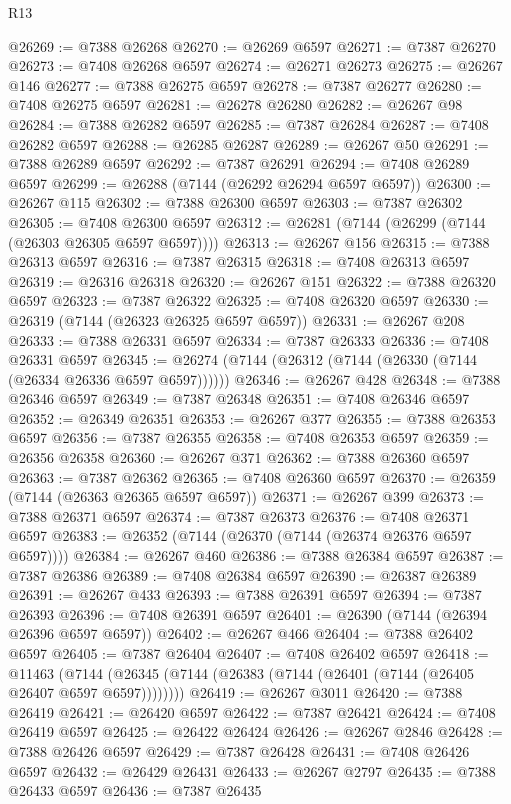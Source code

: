 \begin{lexlean}{R13}
\begin{coremodule}
@26269 := @7388 @26268
@26270 := @26269 @6597
@26271 := @7387 @26270
@26273 := @7408 @26268 @6597
@26274 := @26271 @26273
@26275 := @26267 @146
@26277 := @7388 @26275 @6597
@26278 := @7387 @26277
@26280 := @7408 @26275 @6597
@26281 := @26278 @26280
@26282 := @26267 @98
@26284 := @7388 @26282 @6597
@26285 := @7387 @26284
@26287 := @7408 @26282 @6597
@26288 := @26285 @26287
@26289 := @26267 @50
@26291 := @7388 @26289 @6597
@26292 := @7387 @26291
@26294 := @7408 @26289 @6597
@26299 := @26288 (@7144 (@26292 @26294 @6597 @6597))
@26300 := @26267 @115
@26302 := @7388 @26300 @6597
@26303 := @7387 @26302
@26305 := @7408 @26300 @6597
@26312 := @26281 (@7144 (@26299 (@7144 (@26303 @26305 @6597 @6597))))
@26313 := @26267 @156
@26315 := @7388 @26313 @6597
@26316 := @7387 @26315
@26318 := @7408 @26313 @6597
@26319 := @26316 @26318
@26320 := @26267 @151
@26322 := @7388 @26320 @6597
@26323 := @7387 @26322
@26325 := @7408 @26320 @6597
@26330 := @26319 (@7144 (@26323 @26325 @6597 @6597))
@26331 := @26267 @208
@26333 := @7388 @26331 @6597
@26334 := @7387 @26333
@26336 := @7408 @26331 @6597
@26345 := @26274 (@7144 (@26312 (@7144 (@26330 (@7144 (@26334 @26336 @6597 @6597))))))
@26346 := @26267 @428
@26348 := @7388 @26346 @6597
@26349 := @7387 @26348
@26351 := @7408 @26346 @6597
@26352 := @26349 @26351
@26353 := @26267 @377
@26355 := @7388 @26353 @6597
@26356 := @7387 @26355
@26358 := @7408 @26353 @6597
@26359 := @26356 @26358
@26360 := @26267 @371
@26362 := @7388 @26360 @6597
@26363 := @7387 @26362
@26365 := @7408 @26360 @6597
@26370 := @26359 (@7144 (@26363 @26365 @6597 @6597))
@26371 := @26267 @399
@26373 := @7388 @26371 @6597
@26374 := @7387 @26373
@26376 := @7408 @26371 @6597
@26383 := @26352 (@7144 (@26370 (@7144 (@26374 @26376 @6597 @6597))))
@26384 := @26267 @460
@26386 := @7388 @26384 @6597
@26387 := @7387 @26386
@26389 := @7408 @26384 @6597
@26390 := @26387 @26389
@26391 := @26267 @433
@26393 := @7388 @26391 @6597
@26394 := @7387 @26393
@26396 := @7408 @26391 @6597
@26401 := @26390 (@7144 (@26394 @26396 @6597 @6597))
@26402 := @26267 @466
@26404 := @7388 @26402 @6597
@26405 := @7387 @26404
@26407 := @7408 @26402 @6597
@26418 := @11463
    (@7144 (@26345 (@7144 (@26383 (@7144 (@26401 (@7144 (@26405 @26407 @6597 @6597))))))))
@26419 := @26267 @3011
@26420 := @7388 @26419
@26421 := @26420 @6597
@26422 := @7387 @26421
@26424 := @7408 @26419 @6597
@26425 := @26422 @26424
@26426 := @26267 @2846
@26428 := @7388 @26426 @6597
@26429 := @7387 @26428
@26431 := @7408 @26426 @6597
@26432 := @26429 @26431
@26433 := @26267 @2797
@26435 := @7388 @26433 @6597
@26436 := @7387 @26435

\end{coremodule}
\end{lexlean}
